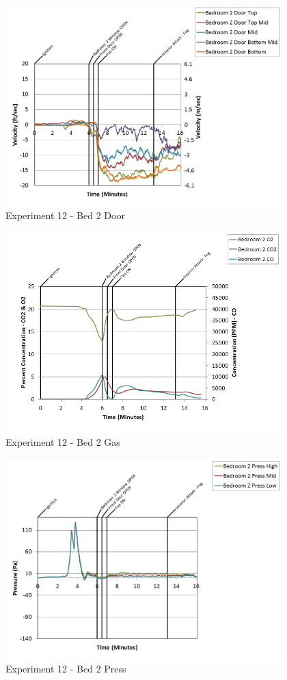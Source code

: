 \documentclass{article}
\begin{document}
\begin{appendices}
\begin{figure}[h!]
	\centering
	\includegraphics[height=3.05in]{0_Images/Results_Charts/Exp_12_Charts/Bed2Door.png}
	\caption{Experiment 12 - Bed 2 Door}
\end{figure}

\clearpage

\begin{figure}[h!]
	\centering
	\includegraphics[height=3.05in]{0_Images/Results_Charts/Exp_12_Charts/Bed2Gas.png}
	\caption{Experiment 12 - Bed 2 Gas}
\end{figure}


\begin{figure}[h!]
	\centering
	\includegraphics[height=3.05in]{0_Images/Results_Charts/Exp_12_Charts/Bed2Press.png}
	\caption{Experiment 12 - Bed 2 Press}
\end{figure}


\end{appendices}
\end{document}
